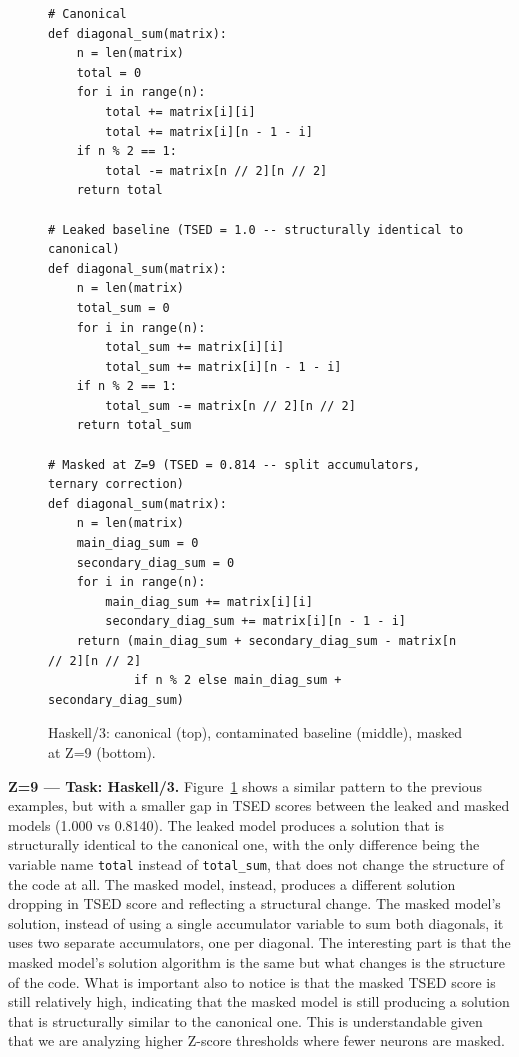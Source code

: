 \documentclass[mscthesis]{usiinfthesis}
\begin{document}
\begin{figure}[H]
\begin{lstlisting}[style=pythonstyle2]
# Canonical
def diagonal_sum(matrix):
    n = len(matrix)
    total = 0
    for i in range(n):
        total += matrix[i][i]
        total += matrix[i][n - 1 - i]
    if n % 2 == 1:
        total -= matrix[n // 2][n // 2]
    return total
 
# Leaked baseline (TSED = 1.0 -- structurally identical to canonical)
def diagonal_sum(matrix):
    n = len(matrix)
    total_sum = 0
    for i in range(n):
        total_sum += matrix[i][i]
        total_sum += matrix[i][n - 1 - i]
    if n % 2 == 1:
        total_sum -= matrix[n // 2][n // 2]
    return total_sum
 
# Masked at Z=9 (TSED = 0.814 -- split accumulators, ternary correction)
def diagonal_sum(matrix):
    n = len(matrix)
    main_diag_sum = 0
    secondary_diag_sum = 0
    for i in range(n):
        main_diag_sum += matrix[i][i]
        secondary_diag_sum += matrix[i][n - 1 - i]
    return (main_diag_sum + secondary_diag_sum - matrix[n // 2][n // 2]
            if n % 2 else main_diag_sum + secondary_diag_sum)
\end{lstlisting}
\caption{Haskell/3: canonical (top), contaminated baseline (middle), masked at Z=9 (bottom).}
\label{fig:haskell3}
\end{figure}
\textbf{Z=9 --- Task: Haskell/3. }
 Figure~\ref{fig:haskell3} shows a similar pattern to the previous examples, but with a smaller gap in TSED scores between the leaked and masked models (1.000 vs 0.8140).
The leaked model produces a solution that is structurally identical to the canonical one, with the only difference
being the variable name \texttt{total} instead of \texttt{total\_sum}, that does not change the structure of the code at all.
The masked model, instead, produces a different solution dropping in TSED score and reflecting a structural change.
The masked model's solution, instead of using a single accumulator variable to sum both diagonals, it uses two separate accumulators,
one per diagonal.
The interesting part is that the masked model's solution algorithm is the same but what changes is the structure of the code.
What is important also to notice is that the masked TSED score is still relatively high, 
indicating that the masked model is still producing a solution that is structurally similar to the canonical one.
This is understandable given that we are analyzing higher Z-score thresholds where fewer neurons are masked.
\end{document}
